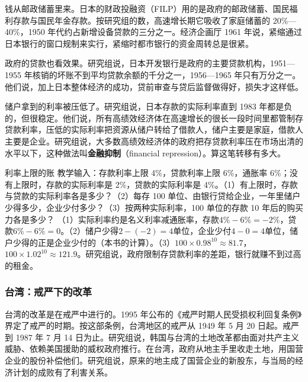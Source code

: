 钱从邮政储蓄里来。日本的财政投融资（FILP）用的是政府的邮政储蓄、国民福利存款与国民年金存款\cite{worldbank1993}。按研究组的数，高速增长期它吸收了家庭储蓄的 20\%—40\%，1950 年代约占新增设备贷款的三分之一\cite{worldbank1993}。经济企画厅 1961 年说，紧缩通过日本银行的窗口规制来实行，紧缩时都市银行的资金周转总是很紧\cite{epa1961}。

政府的贷款也看效果。研究组说，日本开发银行是政府的主要贷款机构，1951—1955 年核销的坏账不到平均贷款余额的千分之一，1956—1965 年只有万分之一\cite{worldbank1993}。他们说，加上日本整体经济的成功，贷前审查与贷后监督做得好，损失才这样低\cite{worldbank1993}。

储户拿到的利率被压低了。研究组说，日本存款的实际利率直到 1983 年都是负的，但很稳定\cite{worldbank1993}。他们说，所有高绩效经济体在高速增长的很长一段时间里都管制存贷款利率，压低的实际利率把资源从储户转给了借款人，储户主要是家庭，借款人主要是企业\cite{worldbank1993}。研究组说，大多数高绩效经济体的政府把存贷款利率压在市场出清的水平以下，这种做法叫\textbf{金融抑制}（financial repression）\cite{worldbank1993}。算这笔转移有多大。

\begin{example}{利率上限的账}\label{ex:eastasia-repression}
教学输入：存款利率上限 4\%，贷款利率上限 6\%，通胀率 6\%；没有上限时，存款的实际利率是 2\%，贷款的实际利率是 4\%。（1）有上限时，存款与贷款的实际利率各是多少？（2）每存 100 单位、由银行贷给企业，一年里储户少得多少，企业少付多少？（3）按两种实际利率，100 单位的存款 10 年后的购买力各是多少？
\solution
（1）实际利率约是名义利率减通胀率，存款$4\%-6\%=-2\%$，贷款$6\%-6\%=0$。（2）储户少得$2-(-2)=4$单位，企业少付$4-0=4$单位，储户少得的正是企业少付的（本书的计算）。（3）$100\times0.98^{10}\approx81.7$，$100\times1.02^{10}\approx121.9$。研究组说，政府限制存贷款利率的差距，银行就赚不到过高的租金\cite{worldbank1993}。
\end{example}

\subsubsection{台湾：戒严下的改革}

台湾的改革是在戒严中进行的。1995 年公布的《戒严时期人民受损权利回复条例》界定了戒严的时期\cite{taiwan1995}。按这部条例，台湾地区的戒严从 1949 年 5 月 20 日起\cite{taiwan1995}。戒严到 1987 年 7 月 14 日为止\cite{taiwan1995}。研究组说，韩国与台湾的土地改革都由面对共产主义威胁、依赖美国援助的威权政府推行\cite{worldbank1993}。在台湾，政府从地主手里收走土地，用国营企业的股份补偿他们\cite{worldbank1993}。研究组说，原来的地主成了国营企业的新股东，与当局的经济计划的成败有了利害关系\cite{worldbank1993}。

